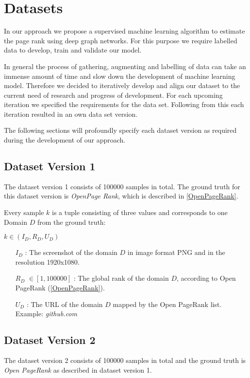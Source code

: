 
\section{Datasets}
In our approach we propose a supervised machine learning algorithm to estimate the page rank using deep graph networks. For this purpose we require labelled data to develop, train and validate our model. 

In general the process of gathering, augmenting and labelling of data can take an immense amount of time and slow down the development of machine learning model. Therefore we decided to iteratively develop and align our dataset to the current need of research and progress of development. For each upcoming iteration we specified the requirements for the data set. Following from this each iteration resulted in an own data set version.

The following sections will profoundly specify each dataset version as required during the development of our approach.

\subsection{Dataset Version 1}
\label{DatasetVersion1}
The dataset version 1 consists of 100000 samples in total. The ground truth for this dataset version is \textit{OpenPage Rank}, which is described in \ref{OpenPageRank}.

Every sample $k$ is a tuple consisting of three values and corresponds to one Domain $D$ from the ground truth:

\begin{center}
 $ k \in (I_D, R_D, U_D)$
\begin{itemize}
	\item[$I_D$]: The screenshot of the domain $D$ in image format PNG and in the resolution 1920x1080.
	\item[$R_D$] $\in [1, 100000]$ : The global rank of the domain $D$, according to Open PageRank (\ref{OpenPageRank}). 
	\item[$U_D$]: The URL of the domain $D$ mapped by the Open PageRank list. Example: \textit{github.com}
\end{itemize}
\end{center}

\subsection{Dataset Version 2}
\label{DatasetVersion2}
The dataset version 2 consists of 100000 samples in total and the ground truth is \textit{Open PageRank} as described in dataset version 1.


